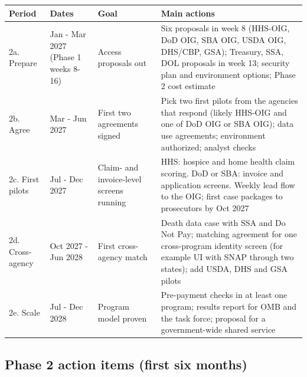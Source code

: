 \documentclass[letterpaper,11pt]{article}
\begin{document}
\begingroup\small\setlength{\tabcolsep}{4pt}\renewcommand{\arraystretch}{1.25}
\begin{longtable}[l]{@{}>{\raggedright\arraybackslash}p{}>{\raggedright\arraybackslash}p{}>{\raggedright\arraybackslash}p{}>{\raggedright\arraybackslash}p{}@{}}
\rowcolor{coolblack}\leavevmode\color{white}\bfseries Period & \leavevmode\color{white}\bfseries Dates & \leavevmode\color{white}\bfseries Goal & \leavevmode\color{white}\bfseries Main actions \\
\endhead
2a. Prepare & Jan - Mar 2027 (Phase 1 weeks 8-16) & Access proposals out & Six proposals in week 8 (HHS-OIG, DoD OIG, SBA OIG, USDA OIG, DHS/CBP, GSA); Treasury, SSA, DOL proposals in week 13; security plan and environment options; Phase 2 cost estimate \\
2b. Agree & Mar - Jun 2027 & First two agreements signed & Pick two first pilots from the agencies that respond (likely HHS-OIG and one of DoD OIG or SBA OIG); data use agreements; environment authorized; analyst checks \\
2c. First pilots & Jul - Dec 2027 & Claim- and invoice-level screens running & HHS: hospice and home health claim scoring. DoD or SBA: invoice and application screens. Weekly lead flow to the OIG; first case packages to prosecutors by Oct 2027 \\
2d. Cross-agency & Oct 2027 - Jun 2028 & First cross-agency match & Death data case with SSA and Do Not Pay; matching agreement for one cross-program identity screen (for example UI with SNAP through two states); add USDA, DHS and GSA pilots \\
2e. Scale & Jul - Dec 2028 & Program model proven & Pre-payment checks in at least one program; results report for OMB and the task force; proposal for a government-wide shared service \\
\end{longtable}\endgroup

\hypertarget{phase-2-action-items-first-six-months}{%
\subsection{Phase 2 action items (first six
months)}\label{phase-2-action-items-first-six-months}}
\end{document}
